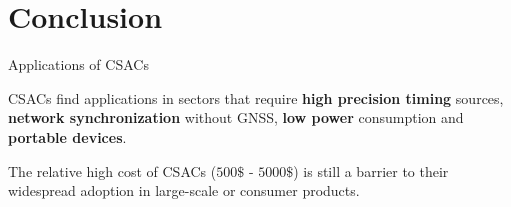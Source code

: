 \section{Conclusion}

\begin{frame}{Applications of CSACs}

    CSACs find applications in sectors that require \textbf{high precision timing} sources, \textbf{network synchronization} without GNSS, \textbf{low power} consumption and \textbf{portable devices}.

    \vspace{10pt}

    The relative high cost of CSACs ($500\$$ - $5000\$$) is still a barrier to their widespread adoption in large-scale or consumer products.

\end{frame}